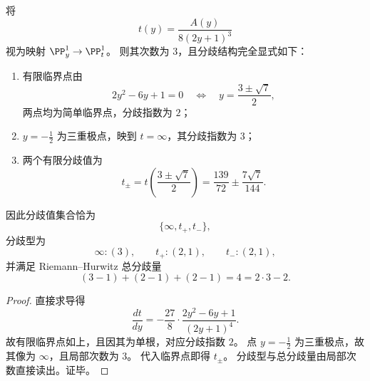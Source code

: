 \begin{theorem}\label{thm:xi-leyang-ty-three-branch-profile}
将
\[
t(y)=\frac{A(y)}{8(2y+1)^3}
\]
视为映射 \(\PP^1_y\to\PP^1_t\)。
则其次数为 \(3\)，且分歧结构完全显式如下：
\begin{enumerate}
  \item 有限临界点由
  \[
  2y^2-6y+1=0
  \quad\Longleftrightarrow\quad
  y=\frac{3\pm\sqrt7}{2},
  \]
  两点均为简单临界点，分歧指数为 \(2\)；
  \item \(y=-\frac12\) 为三重极点，映到 \(t=\infty\)，其分歧指数为 \(3\)；
  \item 两个有限分歧值为
  \[
  t_\pm=t\!\left(\frac{3\pm\sqrt7}{2}\right)=\frac{139}{72}\pm\frac{7\sqrt7}{144}.
  \]
\end{enumerate}
因此分歧值集合恰为
\[
\{\infty,t_+,t_-\},
\]
分歧型为
\[
\infty:(3),\qquad t_+:(2,1),\qquad t_-:(2,1),
\]
并满足 Riemann--Hurwitz 总分歧量
\[
(3-1)+(2-1)+(2-1)=4=2\cdot 3-2.
\]
\end{theorem}
\begin{proof}
直接求导得
\[
\frac{dt}{dy}
=-\frac{27}{8}\cdot\frac{2y^2-6y+1}{(2y+1)^4}.
\]
故有限临界点如上，且因其为单根，对应分歧指数 \(2\)。
点 \(y=-\frac12\) 为三重极点，故其像为 \(\infty\)，且局部次数为 \(3\)。
代入临界点即得 \(t_\pm\)。
分歧型与总分歧量由局部次数直接读出。证毕。
\end{proof}



\endinput
